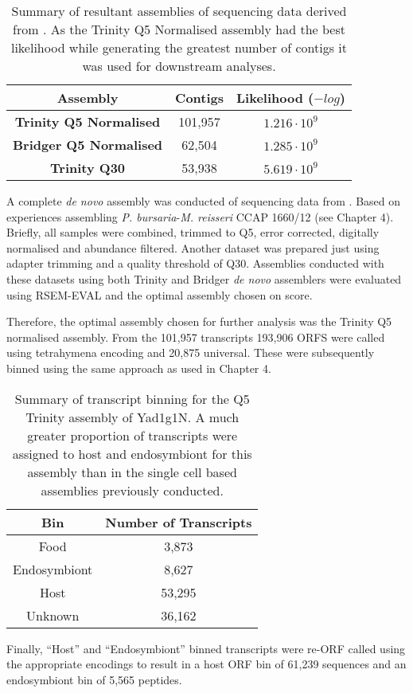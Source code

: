 \begin{table}
    \centering
    \begin{tabular}{|c|c|c|}
        \hline
        \textbf{Assembly} & \textbf{Contigs} & \textbf{Likelihood (\(-log\))}\\
        \hline
        \textbf{Trinity Q5 Normalised}  & 101,957 & \(1.216\cdot10^9\)\\
        \textbf{Bridger Q5 Normalised} & 62,504 & \(1.285\cdot10^9\)\\
        \textbf{Trinity Q30} & 53,938  & \(5.619\cdot10^{9} \) \\
        \hline
    \end{tabular}
    \caption[Summary of Yad1g1N Transcriptome Assemblies]{Summary of resultant 
    assemblies of sequencing data derived from \citep{Kodama2014c}.  As the
Trinity Q5 Normalised assembly had the best likelihood while generating
the greatest number of contigs it was used for downstream analyses.}
    \label{tab:kodama_assembly}
\end{table}

A complete \textit{de novo} assembly was conducted of sequencing data
from \citep{Kodama2014c}.  Based on experiences assembling
\textit{P. bursaria}-\textit{M. reisseri} CCAP 1660/12 (see Chapter 4).
Briefly, all samples were combined, trimmed to Q5, 
error corrected, digitally normalised and abundance filtered.  Another dataset
was prepared just using adapter trimming and a quality threshold of Q30.
Assemblies conducted with these datasets using both Trinity and Bridger
\textit{de novo} assemblers were evaluated using RSEM-EVAL and the optimal
assembly chosen on score. 

Therefore, the optimal assembly chosen for further analysis was the Trinity
Q5 normalised assembly.
From the 101,957 transcripts 193,906 ORFS were called using tetrahymena 
encoding and 20,875 universal.
These were subsequently binned using the same approach as used in 
Chapter 4.

\begin{table}
    \centering
    \begin{tabular}{|c|c|}
        \hline
        \textbf{Bin} & \textbf{Number of Transcripts} \\
        \hline
        Food & 3,873 \\
        Endosymbiont & 8,627 \\
        Host & 53,295 \\
        Unknown & 36,162 \\
        \hline
    \end{tabular}
    \caption[Yad1g1N Transcript Binning Summary]{Summary of transcript
        binning for the Q5 Trinity assembly of Yad1g1N.  
        A much greater proportion of transcripts were assigned
        to host and endosymbiont for this assembly than in the single cell
    based assemblies previously conducted.}
\end{table}
Finally, ``Host'' and ``Endosymbiont'' binned transcripts 
were re-ORF called using the appropriate encodings to result in a 
host ORF bin of 61,239 sequences
and an endosymbiont bin of 5,565 peptides. 

